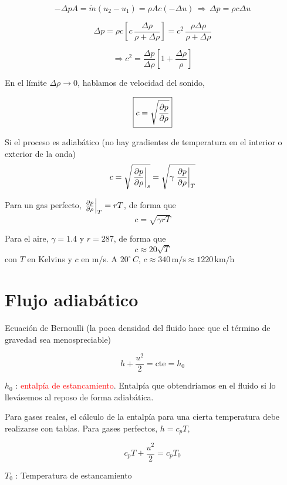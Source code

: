 	
	\[
	-\Delta pA=\dot{m}(u_{2}-u_{1})=\rho Ac(-\Delta u)\,\Rightarrow\,\Delta p=\rho c\Delta u
	\]
	
	\[
	\Delta p=\rho c\left[c\,\frac{\Delta\rho}{\rho+\Delta\rho}\right]=c^{2}\,\frac{\rho\Delta\rho}{\rho+\Delta\rho}
	\]
	
	\[
	\Rightarrow c^{2}=\frac{\Delta p}{\Delta\rho}\left[1+\frac{\Delta\rho}{\rho}\right]
	\]
	
	En el límite $\Delta\rho\rightarrow0$, hablamos de velocidad del
	sonido, 
	
\begin{equation}
		\boxed{c=\sqrt{\frac{\partial p}{\partial \rho}}}
\end{equation}
	
	
	
	Si el proceso es adiabático (no hay gradientes de temperatura en el interior
	o exterior de la onda) 
	\[
	c=\sqrt{\left.\frac{\partial p}{\partial \rho}\right|_{s}}=\sqrt{\gamma\left.\frac{\partial p}{\partial \rho}\right|_{T}}
	\]
	
	Para un gas perfecto, $\left.\frac{\partial p}{\partial \rho}\right|_{T}=rT$, de forma
	que 
	\[
	c=\sqrt{\gamma rT}
	\]
	
	Para el aire, $\gamma=1.4$ y $r=287$, de forma que 
	\[
	c\approx20\sqrt{T}
	\]
	con $T$ en Kelvins y $c$ en m/s. A $20^{\circ}\,C$, $c\approx340\,\text{m/s}\approx1220\,\text{km/h}$


\section{Flujo adiabático}

	
	Ecuación de Bernoulli (la poca densidad del fluido hace que el término
	de gravedad sea menospreciable) 
	
\begin{equation}
		h+\frac{u^{2}}{2}=\text{cte}=h_{0}
\end{equation}
	
	
	$h_{0}$ : \textcolor{red}{entalpía de estancamiento}. Entalpía que
	obtendríamos en el fluido si lo llevásemos al reposo de forma adiabática.
	
	Para gases reales, el cálculo de la entalpía para una cierta temperatura
	debe realizarse con tablas. Para gases perfectos, $h=c_{p}T$, 
	
\begin{equation}
		c_{p}T+\frac{u^{2}}{2}=c_{p}T_{0}
\end{equation}
	
	
	$T_{0}$ : Temperatura de estancamiento
	

